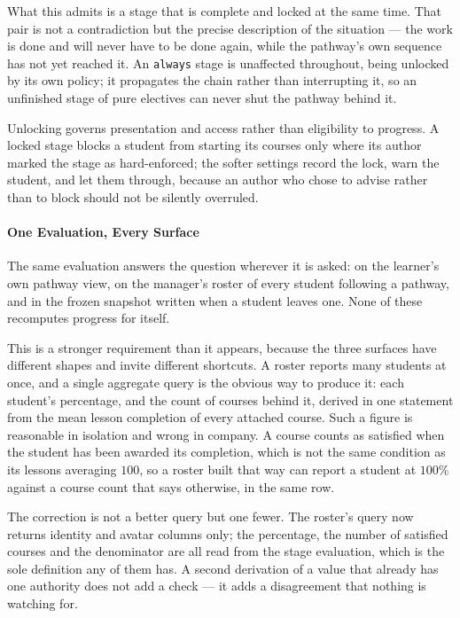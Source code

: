 What this admits is a stage that is complete and locked at the same time. That pair is not a contradiction but the precise description of the situation --- the work is done and will never have to be done again, while the pathway's own sequence has not yet reached it. An \texttt{always} stage is unaffected throughout, being unlocked by its own policy; it propagates the chain rather than interrupting it, so an unfinished stage of pure electives can never shut the pathway behind it.

Unlocking governs presentation and access rather than eligibility to progress. A locked stage blocks a student from starting its courses only where its author marked the stage as hard-enforced; the softer settings record the lock, warn the student, and let them through, because an author who chose to advise rather than to block should not be silently overruled.

\paragraph{One Evaluation, Every Surface}
The same evaluation answers the question wherever it is asked: on the learner's own pathway view, on the manager's roster of every student following a pathway, and in the frozen snapshot written when a student leaves one. None of these recomputes progress for itself.

This is a stronger requirement than it appears, because the three surfaces have different shapes and invite different shortcuts. A roster reports many students at once, and a single aggregate query is the obvious way to produce it: each student's percentage, and the count of courses behind it, derived in one statement from the mean lesson completion of every attached course. Such a figure is reasonable in isolation and wrong in company. A course counts as satisfied when the student has been awarded its completion, which is not the same condition as its lessons averaging $100$, so a roster built that way can report a student at $100\%$ against a course count that says otherwise, in the same row.

The correction is not a better query but one fewer. The roster's query now returns identity and avatar columns only; the percentage, the number of satisfied courses and the denominator are all read from the stage evaluation, which is the sole definition any of them has. A second derivation of a value that already has one authority does not add a check — it adds a disagreement that nothing is watching for.

